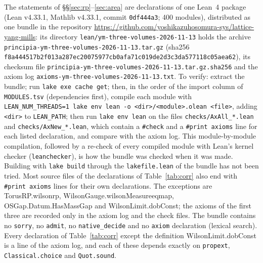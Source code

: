 \documentclass[11pt,a4paper]{article}
\theoremstyle{definition}
\theoremstyle{remark}
\newcommand{\leanus}{\textunderscore\allowbreak{}}
\newcommand{\leandot}{.\allowbreak{}}
\newcommand{\lean}[1]{{\ttfamily\let\_\leanus #1}}
\begin{document}
{\sloppy The statements of \S\S\ref{sec:rp}--\ref{sec:area} are declarations of one Lean~4 package (Lean v4.33.1, Mathlib v4.33.1, commit \texttt{0df444a3}; 400 modules), distributed as one bundle in the repository \url{https://github.com/yoshikazuhosomura-sys/lattice-yang-mills}: its directory \texttt{lean/\allowbreak{}ym-three-volumes-\allowbreak{}2026-11-13} holds the archive \texttt{principia-\allowbreak{}ym-three-volumes-\allowbreak{}2026-11-13.tar.gz} (sha256 \texttt{f8a44451\allowbreak{}7b2f013a\allowbreak{}287ec200\allowbreak{}75977cb0\allowbreak{}afa71c01\allowbreak{}9de2d3c3\allowbreak{}da577118\allowbreak{}c05aea62}), its checksum file \texttt{principia-\allowbreak{}ym-three-volumes-\allowbreak{}2026-11-13.tar.gz.sha256} and the axiom log \texttt{axioms-\allowbreak{}ym-three-volumes-\allowbreak{}2026-11-13.txt}. To verify: extract the bundle; run \texttt{lake exe cache get}; then, in the order of the import column of \texttt{MODULES.tsv} (dependencies first), compile each module with \texttt{LEAN\_NUM\_THREADS=1 lake env lean -o <dir>/<module>.olean <file>}, adding \texttt{<dir>} to \texttt{LEAN\_PATH}; then run \texttt{lake env lean} on the files \texttt{checks/AxAll\_*.lean} and \texttt{checks/AxNew\_*.lean}, which contain a \texttt{\#check} and a \texttt{\#print axioms} line for each listed declaration, and compare with the axiom log. This module-by-module compilation, followed by a re-check of every compiled module with Lean's kernel checker (\texttt{leanchecker}), is how the bundle was checked when it was made. Building with \texttt{lake build} through the \texttt{lakefile.lean} of the bundle has not been tried. Most source files of the declarations of Table~\ref{tab:corr} also end with \texttt{\#print axioms} lines for their own declarations. The exceptions are \lean{TorusRP\leandot{}wilson\_rp}, \lean{WilsonGauge\leandot{}wilsonMeasure\_eq\_map}, \lean{OSGap\leandot{}Datum\leandot{}HasMassGap} and \lean{WilsonLimit\leandot{}dobConst}; the axioms of the first three are recorded only in the axiom log and the check files. The bundle contains no \texttt{sorry}, no \texttt{admit}, no \texttt{native\_decide} and no \texttt{axiom} declaration (lexical search). Every declaration of Table~\ref{tab:corr} except the definition \lean{WilsonLimit\leandot{}dobConst} is a line of the axiom log, and each of these depends exactly on \texttt{propext}, \texttt{Classical.choice} and \texttt{Quot.sound}.\par}
\end{document}

